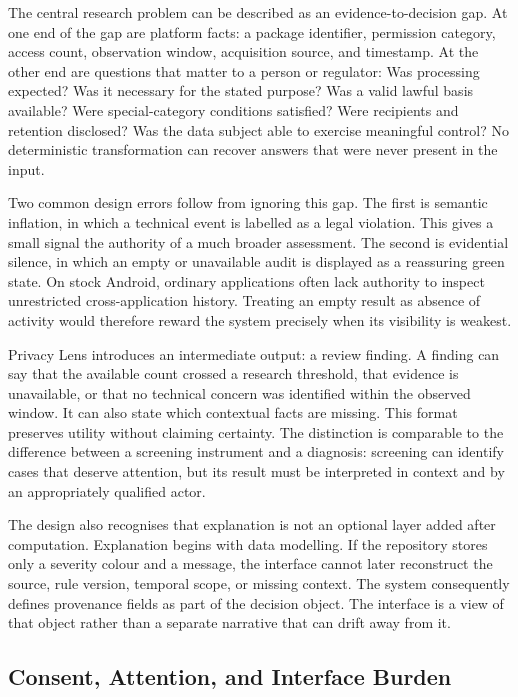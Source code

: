 The central research problem can be described as an evidence-to-decision gap. At one end of the gap are platform facts: a package identifier, permission category, access count, observation window, acquisition source, and timestamp. At the other end are questions that matter to a person or regulator: Was processing expected? Was it necessary for the stated purpose? Was a valid lawful basis available? Were special-category conditions satisfied? Were recipients and retention disclosed? Was the data subject able to exercise meaningful control? No deterministic transformation can recover answers that were never present in the input.

Two common design errors follow from ignoring this gap. The first is semantic inflation, in which a technical event is labelled as a legal violation. This gives a small signal the authority of a much broader assessment. The second is evidential silence, in which an empty or unavailable audit is displayed as a reassuring green state. On stock Android, ordinary applications often lack authority to inspect unrestricted cross-application history. Treating an empty result as absence of activity would therefore reward the system precisely when its visibility is weakest.

Privacy Lens introduces an intermediate output: a review finding. A finding can say that the available count crossed a research threshold, that evidence is unavailable, or that no technical concern was identified within the observed window. It can also state which contextual facts are missing. This format preserves utility without claiming certainty. The distinction is comparable to the difference between a screening instrument and a diagnosis: screening can identify cases that deserve attention, but its result must be interpreted in context and by an appropriately qualified actor.

The design also recognises that explanation is not an optional layer added after computation. Explanation begins with data modelling. If the repository stores only a severity colour and a message, the interface cannot later reconstruct the source, rule version, temporal scope, or missing context. The system consequently defines provenance fields as part of the decision object. The interface is a view of that object rather than a separate narrative that can drift away from it.

\subsection{Consent, Attention, and Interface Burden}

